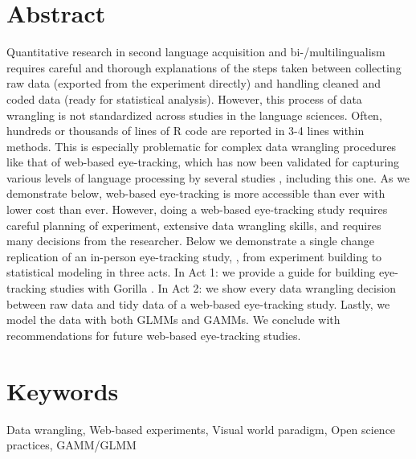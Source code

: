 \section{Abstract}

Quantitative research in second language acquisition and bi-/multilingualism requires careful and thorough explanations of the steps taken between collecting raw data
(exported from the experiment directly) and handling cleaned and coded data (ready for statistical
analysis). However, this process of data wrangling is not standardized across studies in the language
sciences. Often, hundreds or thousands of lines of R code are reported in 3-4 lines within methods. This is especially problematic for complex data wrangling procedures like that of web-based eye-tracking, which has now been validated for capturing various levels of language processing by several studies \parencite[e.g.,][]{Vos_2017,Prystauka_Altmann_Rothman_2023}, including this one.
As we demonstrate below, web-based eye-tracking is more accessible than ever with lower cost than ever. However, doing a web-based eye-tracking study requires careful planning of experiment, extensive data wrangling skills, and requires many decisions from the researcher. Below we demonstrate a single change replication of an in-person eye-tracking study, \textcite{Porretta_et_al_2020}, from experiment building to statistical modeling in three acts. In Act 1: we provide a guide for building eye-tracking studies with Gorilla \parencite{Gorilla}. In Act 2: we show every data wrangling decision between raw data and tidy data of a web-based eye-tracking study. Lastly, we model the data with both GLMMs and GAMMs. We conclude with recommendations for future web-based eye-tracking studies.


\section{Keywords}
Data wrangling, Web-based experiments, Visual world paradigm, Open science practices, GAMM/GLMM




